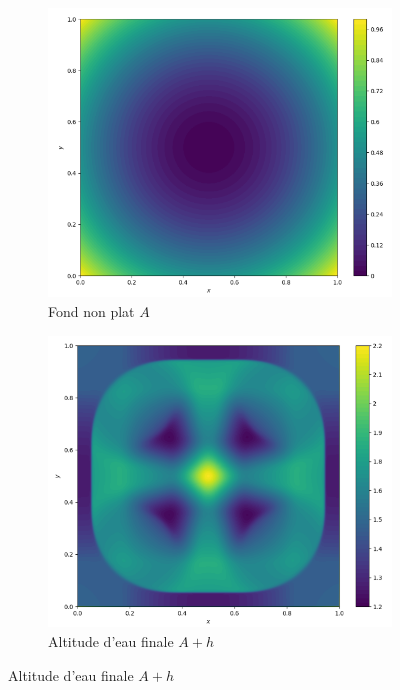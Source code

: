 \documentclass[
	french,
	11pt, %
]{fphw}
\begin{document}
\begin{figure}[H]
	\centering
	\begin{subfigure}{0.45\textwidth}
		\centering
		\includegraphics[width=\textwidth,height=0.85\textwidth]{Bonus1A.png}
		\caption{Fond non plat $A$}
	\end{subfigure}
	\begin{subfigure}{0.45\textwidth}
		\centering
		\includegraphics[width=\textwidth,height=0.85\textwidth]{Bonus1Aplush.png}
		\caption{Altitude d'eau finale $A+h$}

\end{subfigure}
\end{figure}
\end{document}
